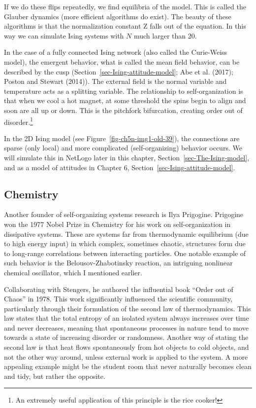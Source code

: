 \documentclass[
  a4paper,
  DIV=11,
  numbers=noendperiod,
  oneside]{scrreprt}
\begin{document}
If we do these flips repeatedly, we find equilibria of the model. This
is called the Glauber dynamics (more efficient algorithms do exist). The
beauty of these algorithms is that the normalization constant Z falls
out of the equation. In this way we can simulate Ising systems with
\(N\) much larger than 20.

In the case of a fully connected Ising network (also called the
Curie-Weiss model), the emergent behavior, what is called the mean field
behavior, can be described by the cusp
(Section~\ref{sec-Ising-attitude-model}; Abe et al. (2017); Poston and
Stewart (2014)). The external field is the normal variable and
temperature acts as a splitting variable. The relationship to
self-organization is that when we cool a hot magnet, at some threshold
the spins begin to align and soon are all up or down. This is the
pitchfork bifurcation, creating order out of disorder.\footnote{An
  extremely useful application of this principle is the rice cooker!}

In the 2D Ising model (see Figure~\ref{fig-ch5n-img1-old-39}), the
connections are sparse (only local) and more complicated
(self-organizing) behavior occurs. We will simulate this in NetLogo
later in this chapter, Section~\ref{sec-The-Ising-model}, and as a model
of attitudes in Chapter 6, Section~\ref{sec-Ising-attitude-model}.

\hypertarget{sec-Chemistry}{%
\subsection{Chemistry}\label{sec-Chemistry}}

Another founder of self-organizing systems research is Ilya Prigogine.
Prigogine won the 1977 Nobel Prize in Chemistry for his work on
self-organization in dissipative systems. These are systems far from
thermodynamic equilibrium (due to high energy input) in which complex,
sometimes chaotic, structures form due to long-range correlations
between interacting particles. One notable example of such behavior is
the Belousov-Zhabotinsky reaction, an intriguing nonlinear chemical
oscillator, which I mentioned earlier.

Collaborating with Stengers, he authored the influential book ``Order
out of Chaos'' in 1978. This work significantly influenced the
scientific community, particularly through their formulation of the
second law of thermodynamics. This law states that the total entropy of
an isolated system always increases over time and never decreases,
meaning that spontaneous processes in nature tend to move towards a
state of increasing disorder or randomness. Another way of stating the
second law is that heat flows spontaneously from hot objects to cold
objects, and not the other way around, unless external work is applied
to the system. A more appealing example might be the student room that
never naturally becomes clean and tidy, but rather the opposite.
\end{document}
